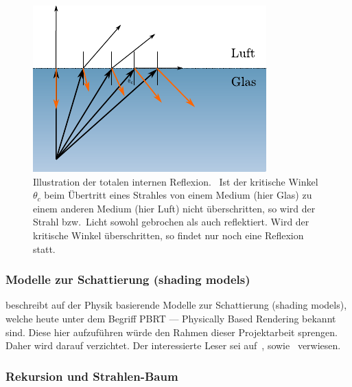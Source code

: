 \begin{figure}[H]\label{fig:ray_tracing_total_internal_reflection}
    \centering
    \includegraphics{img/total_internal_reflection.pdf}
    \caption{Illustration der totalen internen
        Reflexion.~\protect\footnotemark{}
        Ist der kritische Winkel $\theta_{c}$ beim Übertritt eines
        Strahles von einem Medium (hier Glas) zu einem anderen Medium (hier
        Luft) nicht überschritten, so wird der Strahl bzw.\ Licht sowohl
        gebrochen als auch reflektiert. Wird der kritische Winkel
        überschritten, so findet nur noch eine Reflexion
        statt.\protect\footnotemark}
\end{figure}
\addtocounter{footnote}{-2}

\subsubsection{Modelle zur Schattierung (shading models)}
\label{ssubsec:ray_tracing:shading_models}

\citeauthor{glassner_introduction_1989} beschreibt auf der Physik
basierende Modelle zur Schattierung (shading models), welche heute unter
dem Begriff PBRT --- Physically Based Rendering bekannt sind. Diese
hier aufzuführen würde den Rahmen dieser Projektarbeit sprengen. Daher
wird darauf verzichtet. Der interessierte Leser sei
auf~,
sowie~ verwiesen.

\subsubsection{Rekursion und Strahlen-Baum}
\label{ssubsec:ray_tracing:recursion}

